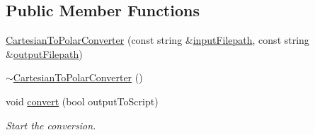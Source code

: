 \subsection*{Public Member Functions}
\begin{DoxyCompactItemize}
\item 
\hyperlink{classmultiscale_1_1video_1_1CartesianToPolarConverter_ab1c91591a31c7a23421643260335bdcd}{Cartesian\-To\-Polar\-Converter} (const string \&\hyperlink{classmultiscale_1_1video_1_1CartesianToPolarConverter_aa15eca9e8d3da0eb8ff1b6583e392f05}{input\-Filepath}, const string \&\hyperlink{classmultiscale_1_1video_1_1CartesianToPolarConverter_a024d95ab3b9de6ed6fd1d951c5575e65}{output\-Filepath})
\item 
\hyperlink{classmultiscale_1_1video_1_1CartesianToPolarConverter_a7842464665976d381df75f03d7c71347}{$\sim$\-Cartesian\-To\-Polar\-Converter} ()
\item 
void \hyperlink{classmultiscale_1_1video_1_1CartesianToPolarConverter_aae3e7e842456da18741bccccdf084922}{convert} (bool output\-To\-Script)
\begin{DoxyCompactList}\small\item\em Start the conversion. \end{DoxyCompactList}\end{DoxyCompactItemize}
